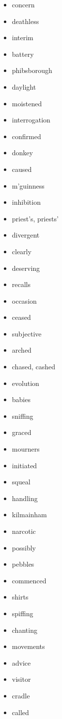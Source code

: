 \documentclass{article}
\begin{document}
\begin{itemize}
    \item concern
    \item deathless
    \item interim
    \item battery
    \item phibsborough
    \item daylight
    \item moistened
    \item interrogation
    \item confirmed
    \item donkey
    \item caused
    \item m'guinness
    \item inhibition
    \item priest's, priests'
    \item divergent
    \item clearly
    \item deserving
    \item recalls
    \item occasion
    \item ceased
    \item subjective
    \item arched
    \item chased, cashed
    \item evolution
    \item babies
    \item sniffing
    \item graced
    \item mourners
    \item initiated
    \item squeal
    \item handling
    \item kilmainham
    \item narcotic
    \item possibly
    \item pebbles
    \item commenced
    \item shirts
    \item spiffing
    \item chanting
    \item movements
    \item advice
    \item visitor
    \item cradle
    \item called

\end{itemize}
\end{document}
